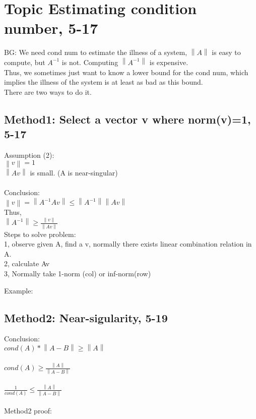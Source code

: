 \documentclass{article}
\begin{document}
\section{Topic Estimating condition number, 5-17}
BG: We need cond num to estimate the illness of a system, $\left\lVert A\right\rVert$ is easy
to compute, but $A^{-1}$ is not. Computing $\left\lVert A^{-1}\right\rVert $ is expensive.\\
Thus, we sometimes just want to know a lower bound for the cond num, which implies the illness
of the system is at least as bad as this bound.\\
There are two ways to do it.

\subsection*{Method1: Select a vector v where norm(v)=1, 5-17}
Assumption (2): \\
$\left\lVert v\right\rVert =1$\\
$\left\lVert Av\right\rVert$ is small. (A is near-singular)\\
\\
\noindent
Conclusion:\\
$\left\lVert v\right\rVert  = \left\lVert A^{-1} Av\right\rVert \leq \left\lVert A^{-1}\right\rVert \left\lVert Av\right\rVert $\\
Thus,\\
$\left\lVert A^{-1}\right\rVert \geq \frac{\left\lVert v\right\rVert}{\left\lVert Av\right\rVert}$\\

\noindent
Steps to solve problem:\\
1, observe given A, find a v, normally there exists linear combination relation in A.\\
2, calculate Av\\
3, Normally take 1-norm (col) or inf-norm(row)

Example:


\subsection*{Method2: Near-sigularity, 5-19}
Conclusion:\\
$cond(A) * \left\lVert A-B\right\rVert \geq \left\lVert A\right\rVert $\\
\\
$cond(A) \geq \frac{\left\lVert A\right\rVert }{\left\lVert A-B\right\rVert }$\\
\\
$\frac{1}{cond(A)} \leq \frac{\left\lVert A\right\rVert }{\left\lVert A-B\right\rVert }$\\
\\
\noindent
Method2 proof:\\
\end{document}
